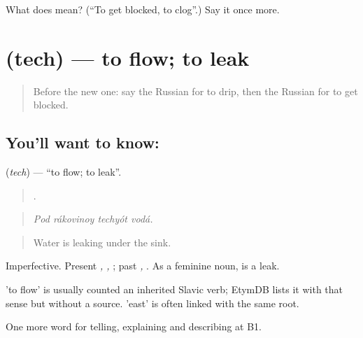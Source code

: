 \begin{tcolorbox}[breakable,colback=teal!4,colframe=teal!35!black,title={Before you move on}]
What does  mean? (\textquotedblleft{}To get blocked, to clog\textquotedblright{}.) Say it once more.
\end{tcolorbox}
\section[\texorpdfstring{\ru{течь} (tech)}{течь (tech)}]{ (tech) — to flow; to leak}

\label{lesson:RU-C432-tech}



\begin{quote}
Before the new one: say the Russian for to drip, then the Russian for to get blocked.
\end{quote}

\subsection*{You'll want to know: }
\textbf{} (\emph{tech}) — \textquotedblleft{}to flow; to leak\textquotedblright{}.

\begin{quote}
   .
\end{quote}

\begin{quote}
\emph{Pod rákovinoy techyót vodá.}
\end{quote}

\begin{quote}
Water is leaking under the sink.
\end{quote}

Imperfective. Present \emph{, , }; past \emph{, }. As a feminine noun, \emph{} is a leak.

\begin{cousinweb}
\emph{} 'to flow' is usually counted an inherited Slavic verb; EtymDB lists it with that sense but without a source. \emph{} 'east' is often linked with the same root.
\end{cousinweb}

\begin{grammarlens}[title={What you've built}]
One more word for telling, explaining and describing at B1.
\end{grammarlens}

